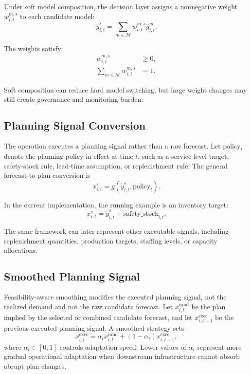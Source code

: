 Under soft model composition, the decision layer assigns a nonnegative weight $w_{i,t}^{m,s}$ to each candidate model:
\begin{equation}
    \tilde{y}_{i,t}^{s} = \sum_{m \in \mathcal{M}} w_{i,t}^{m,s}\hat{y}_{i,t}^{m}.
\end{equation}

The weights satisfy:
\begin{align}
    w_{i,t}^{m,s} &\geq 0, \\
    \sum_{m \in \mathcal{M}} w_{i,t}^{m,s} &= 1.
\end{align}

Soft composition can reduce hard model switching, but large weight changes may still create governance and monitoring burden.

\subsection{Planning Signal Conversion}

The operation executes a planning signal rather than a raw forecast. Let $\mathrm{policy}_{t}$ denote the planning policy in effect at time $t$, such as a service-level target, safety-stock rule, lead-time assumption, or replenishment rule. The general forecast-to-plan conversion is
\begin{equation}
    x_{i,t}^{s} = g\left(\tilde{y}_{i,t}^{s}, \mathrm{policy}_{t}\right).
\end{equation}

In the current implementation, the running example is an inventory target:
\begin{equation}
    x_{i,t}^{s} = \tilde{y}_{i,t}^{s} + \mathrm{safety\_stock}_{i,t}.
\end{equation}

The same framework can later represent other executable signals, including replenishment quantities, production targets, staffing levels, or capacity allocations.

\subsection{Smoothed Planning Signal}

Feasibility-aware smoothing modifies the executed planning signal, not the realized demand and not the raw candidate forecast. Let $x_{i,t}^{\mathrm{cand}}$ be the plan implied by the selected or combined candidate forecast, and let $x_{i,t-1}^{\mathrm{exec}}$ be the previous executed planning signal. A smoothed strategy sets
\begin{equation}
    x_{i,t}^{\mathrm{exec}}
    =
    \alpha_{t} x_{i,t}^{\mathrm{cand}}
    +
    (1-\alpha_{t})x_{i,t-1}^{\mathrm{exec}},
\end{equation}
where $\alpha_t \in [0,1]$ controls adaptation speed. Lower values of $\alpha_t$ represent more gradual operational adaptation when downstream infrastructure cannot absorb abrupt plan changes.

